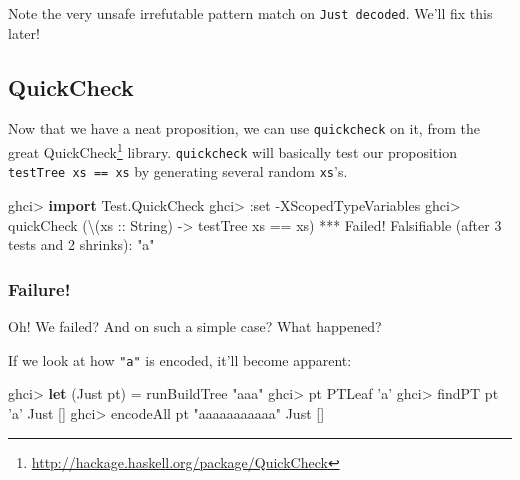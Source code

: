 \documentclass[]{article}
\newenvironment{Shaded}{}{}
\newcommand{\KeywordTok}[1]{\textcolor[rgb]{0.00,0.44,0.13}{\textbf{{#1}}}}
\newcommand{\DataTypeTok}[1]{\textcolor[rgb]{0.56,0.13,0.00}{{#1}}}
\newcommand{\DecValTok}[1]{\textcolor[rgb]{0.25,0.63,0.44}{{#1}}}
\newcommand{\CharTok}[1]{\textcolor[rgb]{0.25,0.44,0.63}{{#1}}}
\newcommand{\StringTok}[1]{\textcolor[rgb]{0.25,0.44,0.63}{{#1}}}
\newcommand{\OtherTok}[1]{\textcolor[rgb]{0.00,0.44,0.13}{{#1}}}
\newcommand{\FunctionTok}[1]{\textcolor[rgb]{0.02,0.16,0.49}{{#1}}}
\newcommand{\NormalTok}[1]{{#1}}
\renewcommand{\href}[2]{#2\footnote{\url{#1}}}
\begin{document}
Note the very unsafe irrefutable pattern match on
\texttt{Just\ decoded}. We'll fix this later!

\subsection{QuickCheck}\label{quickcheck}

Now that we have a neat proposition, we can use \texttt{quickcheck} on
it, from the great
\href{http://hackage.haskell.org/package/QuickCheck}{QuickCheck}
library. \texttt{quickcheck} will basically test our proposition
\texttt{testTree\ xs\ ==\ xs} by generating several random
\texttt{xs}'s.

\begin{Shaded}
\begin{Highlighting}[]
\NormalTok{ghci}\FunctionTok{>} \KeywordTok{import }\DataTypeTok{Test.QuickCheck}
\NormalTok{ghci}\FunctionTok{>} \FunctionTok{:}\NormalTok{set }\FunctionTok{-}\DataTypeTok{XScopedTypeVariables}
\NormalTok{ghci}\FunctionTok{>} \NormalTok{quickCheck (\textbackslash{}(}\OtherTok{xs ::} \DataTypeTok{String}\NormalTok{) }\OtherTok{->} \NormalTok{testTree xs }\FunctionTok{==} \NormalTok{xs)}
\FunctionTok{***} \DataTypeTok{Failed}\FunctionTok{!} \DataTypeTok{Falsifiable} \NormalTok{(after }\DecValTok{3} \NormalTok{tests and }\DecValTok{2} \NormalTok{shrinks)}\FunctionTok{:}
\StringTok{"a"}
\end{Highlighting}
\end{Shaded}

\subsubsection{Failure!}\label{failure}

Oh! We failed? And on such a simple case? What happened?

If we look at how \texttt{"a"} is encoded, it'll become apparent:

\begin{Shaded}
\begin{Highlighting}[]
\NormalTok{ghci}\FunctionTok{>} \KeywordTok{let} \NormalTok{(}\DataTypeTok{Just} \NormalTok{pt) }\FunctionTok{=} \NormalTok{runBuildTree }\StringTok{"aaa"}
\NormalTok{ghci}\FunctionTok{>} \NormalTok{pt}
\DataTypeTok{PTLeaf} \CharTok{'a'}
\NormalTok{ghci}\FunctionTok{>} \NormalTok{findPT pt }\CharTok{'a'}
\DataTypeTok{Just} \NormalTok{[]}
\NormalTok{ghci}\FunctionTok{>} \NormalTok{encodeAll pt }\StringTok{"aaaaaaaaaaa"}
\DataTypeTok{Just} \NormalTok{[]}
\end{Highlighting}
\end{Shaded}
\end{document}

